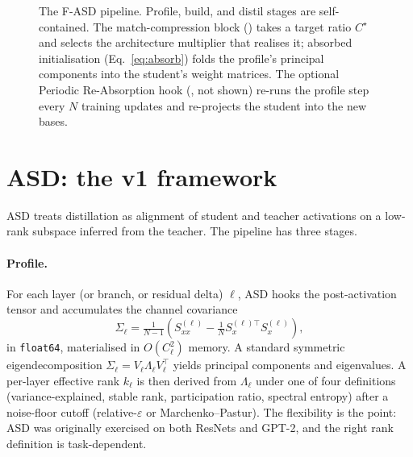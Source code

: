 \documentclass[11pt]{article}
\newcommand{\fasd}{\textsc{F-ASD}}
\newcommand{\asd}{\textsc{ASD}}
\begin{document}
\begin{figure}[t]
\caption{The \fasd{} pipeline. Profile, build, and distil stages are
self-contained. The match-compression block () takes
a target ratio $C^\star$ and selects the architecture multiplier that
realises it; absorbed initialisation (Eq.~\ref{eq:absorb}) folds the
profile's principal components into the student's weight matrices. The
optional Periodic Re-Absorption hook (, not shown) re-runs
the profile step every $N$ training updates and re-projects the student
into the new bases.}
\label{fig:pipeline}
\end{figure}

\section{ASD: the v1 framework}
\label{sec:asd}

\asd{} treats distillation as alignment of student and teacher activations
on a low-rank subspace inferred from the teacher. The pipeline has three
stages.

\paragraph{Profile.}
For each layer (or branch, or residual delta) $\ell$, \asd{} hooks the
post-activation tensor and accumulates the channel covariance
\begin{equation}
\Sigma_\ell = \tfrac{1}{N-1}\!\left(S_{xx}^{(\ell)} - \tfrac{1}{N} S_x^{(\ell)\top} S_x^{(\ell)}\right),
\end{equation}
in \texttt{float64}, materialised in $O(C_\ell^2)$ memory.
A standard symmetric eigendecomposition $\Sigma_\ell = V_\ell \Lambda_\ell V_\ell^\top$
yields principal components and eigenvalues. A per-layer effective rank
$k_\ell$ is then derived from $\Lambda_\ell$ under one of four
definitions (variance-explained, stable rank, participation ratio,
spectral entropy) after a noise-floor cutoff (relative-$\varepsilon$ or
Marchenko--Pastur). The flexibility is the point: \asd{} was originally
exercised on both ResNets and GPT-2, and the right rank definition is
task-dependent.
\end{document}
